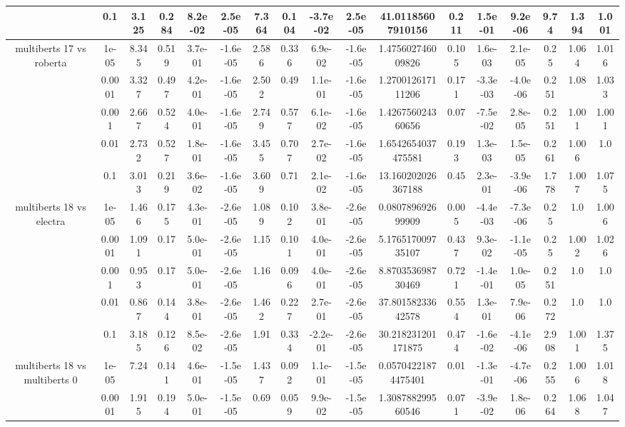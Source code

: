 \begin{tabular}{|c|c|c|c|c|c|c|c|c|c|c|c|c|c|c|c|c|}
 & 0.1 & 3.125 & 0.284 & 8.2e-02 & 2.5e-05 & 7.364 & 0.104 & -3.7e-02 & 2.5e-05 & 41.01185607910156 & 0.211 & 1.5e-01 & 9.2e-06 & 9.74 & 1.394 & 1.001 \\
\hline
\multirow{5}{*}{multiberts 17 vs roberta } & 1e-05 & 8.345 & 0.519 & 3.7e-01 & -1.6e-05 & 2.586 & 0.336 & 6.9e-02 & -1.6e-05 & 1.475602746009826 & 0.105 & 1.6e-03 & 2.1e-05 & 0.25 & 1.064 & 1.016 \\
 & 0.0001 & 3.327 & 0.497 & 4.2e-01 & -1.6e-05 & 2.502 & 0.49 & 1.1e-01 & -1.6e-05 & 1.270012617111206 & 0.171 & -3.3e-03 & -4.0e-06 & 0.251 & 1.08 & 1.033 \\
 & 0.001 & 2.667 & 0.524 & 4.0e-01 & -1.6e-05 & 2.749 & 0.577 & 6.1e-02 & -1.6e-05 & 1.426756024360656 & 0.07 & -7.5e-02 & 2.8e-05 & 0.251 & 1.001 & 1.001 \\
 & 0.01 & 2.732 & 0.527 & 1.8e-01 & -1.6e-05 & 3.455 & 0.707 & 2.7e-02 & -1.6e-05 & 1.6542654037475581 & 0.193 & 1.3e-03 & 1.5e-05 & 0.261 & 1.006 & 1.0 \\
 & 0.1 & 3.013 & 0.219 & 3.6e-02 & -1.6e-05 & 3.609 & 0.71 & 2.1e-02 & -1.6e-05 & 13.160202026367188 & 0.45 & 2.3e-01 & -3.9e-06 & 1.778 & 1.007 & 1.075 \\
\hline
\multirow{5}{*}{multiberts 18 vs electra } & 1e-05 & 1.466 & 0.175 & 4.3e-01 & -2.6e-05 & 1.089 & 0.102 & 3.8e-01 & -2.6e-05 & 0.080789692699909 & 0.005 & -4.4e-03 & -7.3e-06 & 0.25 & 1.0 & 1.006 \\
 & 0.0001 & 1.091 & 0.17 & 5.0e-01 & -2.6e-05 & 1.15 & 0.101 & 4.0e-01 & -2.6e-05 & 5.176517009735107 & 0.437 & 9.3e-02 & -1.1e-05 & 0.25 & 1.002 & 1.026 \\
 & 0.001 & 0.953 & 0.17 & 5.0e-01 & -2.6e-05 & 1.16 & 0.096 & 4.0e-01 & -2.6e-05 & 8.870353698730469 & 0.721 & -1.4e-01 & 1.0e-05 & 0.251 & 1.0 & 1.0 \\
 & 0.01 & 0.867 & 0.144 & 3.8e-01 & -2.6e-05 & 1.462 & 0.227 & 2.7e-01 & -2.6e-05 & 37.80158233642578 & 0.554 & 1.3e-01 & 7.9e-06 & 0.272 & 1.0 & 1.0 \\
 & 0.1 & 3.185 & 0.126 & 8.5e-02 & -2.6e-05 & 1.91 & 0.334 & -2.2e-01 & -2.6e-05 & 30.218231201171875 & 0.474 & -1.6e-02 & -4.1e-06 & 2.908 & 1.001 & 1.375 \\
\hline
\multirow{5}{*}{multiberts 18 vs multiberts 0} & 1e-05 & 7.24 & 0.141 & 4.6e-01 & -1.5e-05 & 1.437 & 0.092 & 1.1e-01 & -1.5e-05 & 0.05704221874475401 & 0.01 & -1.3e-01 & -4.7e-06 & 0.255 & 1.006 & 1.018 \\
 & 0.0001 & 1.915 & 0.194 & 5.0e-01 & -1.5e-05 & 0.69 & 0.059 & 9.9e-02 & -1.5e-05 & 1.308788299560546 & 0.071 & -3.9e-02 & 1.8e-06 & 0.264 & 1.068 & 1.047 \\

\end{tabular}
